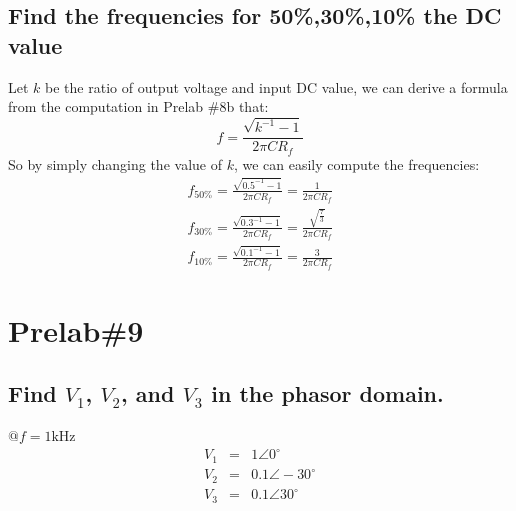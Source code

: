 \documentclass{IEEEtran}
\begin{document}
	\subsection{Find the frequencies for 50\%,30\%,10\% the DC value}
	Let $k$ be the ratio of output voltage and input DC value, we can derive a formula from the computation in Prelab \#8b that:\\
	\begin{equation}
		f = \frac{\sqrt{k^{-1}-1}}{2\pi CR_f}
	\end{equation}
	So by simply changing the value of $k$, we can easily compute the frequencies:\\
	\begin{eqnarray}
		f_{50\%} = \frac{\sqrt{0.5^{-1}-1}}{2\pi CR_f} = \frac{1}{2\pi CR_f}\\
		f_{30\%} = \frac{\sqrt{0.3^{-1}-1}}{2\pi CR_f} = \frac{\sqrt{\frac{7}{3}}}{2\pi CR_f}\\
		f_{10\%} = \frac{\sqrt{0.1^{-1}-1}}{2\pi CR_f} = \frac{3}{2\pi CR_f}
	\end{eqnarray} 
	\section{\textbf{Prelab\#9}}
	\subsection{Find $V_1$, $V_2$, and $V_3$ in the phasor domain.}
	$\mathbf{@} f = 1\mathrm{kHz}$
	\begin{eqnarray}
		V_1 & = & 1\angle 0^{\circ}\\
		V_2 & = & 0.1\angle -30^{\circ}\\
		V_3 & = & 0.1\angle 30^{\circ}
	\end{eqnarray}
\end{document}
